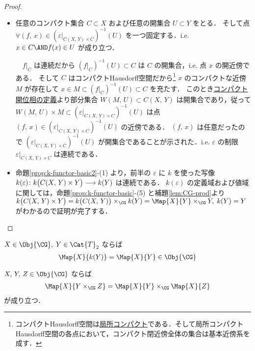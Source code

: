 \documentclass[algtopo_main]{subfiles}
\begin{document}
\begin{proof}
    \begin{itemize}
        \item 任意のコンパクト集合 $C \subset X$ および任意の開集合 $U \subset Y$ をとる．
        そして点 $\forall (f,\, x) \in (\varepsilon|_{C(X,\, Y) \times C})^{-1}(U)$ を一つ固定する．i.e. $x \in C \AND f(x) \in U$ が成り立つ．
        
        　$f|_C$ は連続だから $(f|_C)^{-1}(U) \subset C$ は $C$ の開集合，i.e. 点 $x$ の開近傍である．
        そして $C$ はコンパクトHausdorff空間だから\footnote{コンパクトHausdorff空間は\hyperref[def:loc-compact]{局所コンパクト}である．そして局所コンパクトHausdorff空間の各点において，コンパクト閉近傍全体の集合は基本近傍系を成す．}
        $x$ のコンパクトな近傍 $M$ が存在して $x \in M \subset (f|_C)^{-1}(U) \subset C$ を充たす．
        このとき\hyperref[def:compact-open]{コンパクト開位相の定義}より部分集合 $W(M,\, U) \subset C(X,\, Y)$ は開集合であり，従って $W(M,\, U) \times M \subset (\varepsilon|_{C(X,\, Y) \times C})^{-1}(U)$ は点 $(f,\, x) \in (\varepsilon|_{C(X,\, Y) \times C})^{-1}(U)$ の近傍である．
        $(f,\, x)$ は任意だったので $(\varepsilon|_{C(X,\, Y) \times C})^{-1}(U)$ が開集合であることが示された．i.e. $\varepsilon$ の制限 $\varepsilon|_{C(X,\, Y) \times C}$ は連続である．
        \item 命題\ref{prop:k-functor-basic2}-(1) より，前半の $\varepsilon$ に $k$ を使った写像 $k(\varepsilon) \colon k \bigl( C(X,\, Y) \times Y \bigr) \longrightarrow k(Y)$ は連続である．
        $k(\varepsilon)$ の定義域および値域に関しては，命題\ref{prop:k-functor-basic}-(5) と補題\ref{lem:CG-prod}より $k \bigl( C(X,\, Y) \times Y \bigr) = k \bigl( C(X,\, Y) \bigr) \times_{\CG} k(Y) = \Map{X}{Y} \times_{\CG} Y,\; k(Y) = Y$ がわかるので証明が完了する．
    \end{itemize}
    
\end{proof}

\begin{mylem}[label=lem:Hausdorff-functionspace]{}
    $X \in \Obj{\CG},\; Y \in \Cat{T}_2$ ならば
    \begin{align}
        \Map{X}{k(Y)} = \Map{X}{Y} \in \Obj{\CG}
    \end{align}
\end{mylem}


\begin{mytheo}[label=thm:CG-Map-prod]{}
    $X,\, Y,\, Z \in \Obj{\CG}$ ならば
    \begin{align}
        \Map{X}{Y \times_{\CG} Z} = \Map{X}{Y} \times_{\CG} \Map{X}{Z}
    \end{align}
    が成り立つ．
\end{mytheo}
\end{document}
